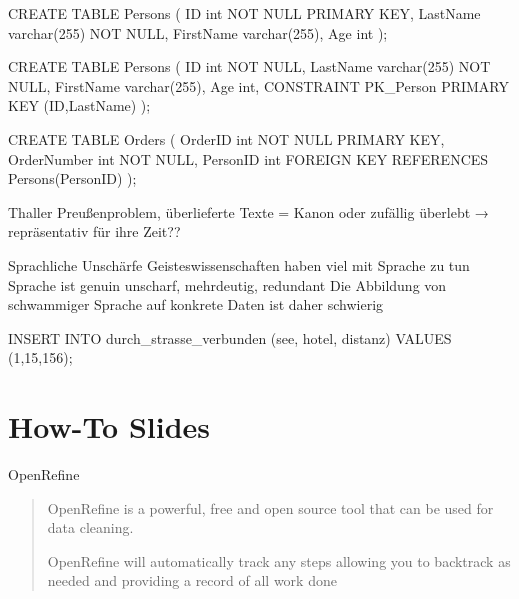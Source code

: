 \begin{sqlcode}
CREATE TABLE Persons (
    ID int NOT NULL PRIMARY KEY,
    LastName varchar(255) NOT NULL,
    FirstName varchar(255),
    Age int
);

CREATE TABLE Persons (
    ID int NOT NULL,
    LastName varchar(255) NOT NULL,
    FirstName varchar(255),
    Age int,
    CONSTRAINT PK_Person PRIMARY KEY (ID,LastName)
);
\end{sqlcode}

\begin{sqlcode}
CREATE TABLE Orders (
    OrderID int NOT NULL PRIMARY KEY,
    OrderNumber int NOT NULL,
    PersonID int FOREIGN KEY REFERENCES Persons(PersonID)
);
\end{sqlcode}




Thaller Preußenproblem, überlieferte Texte = Kanon oder zufällig überlebt → repräsentativ für ihre Zeit??

Sprachliche Unschärfe
Geisteswissenschaften haben viel mit Sprache zu tun
Sprache ist genuin unscharf, mehrdeutig, redundant
Die Abbildung von schwammiger Sprache auf konkrete Daten ist daher schwierig



\begin{sqlcode}
    INSERT INTO durch_strasse_verbunden (see, hotel, distanz) 
    VALUES (1,15,156);
\end{sqlcode}



\section{How-To Slides}

      \begin{block}{OpenRefine}
      \begin{quote}
        OpenRefine is a powerful, free and open source tool that can be used for data cleaning.
        
        OpenRefine will automatically track any steps allowing you to backtrack as needed and providing a record of all work done
    \end{quote}
      \end{block}
      
      
      

